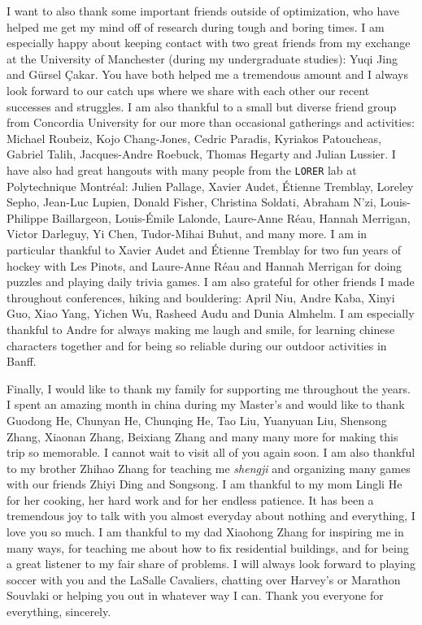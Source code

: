 I want to also thank some important friends outside of
optimization, who have helped me get my mind off of research
during tough and boring times.
I am especially happy about keeping contact with two great friends
from my exchange at the University of Manchester (during
my undergraduate studies): Yuqi Jing and Gürsel Çakar.
You have both helped me a tremendous amount and 
I always look forward to our catch ups where we share with each
other our recent successes and struggles.
I am also thankful to a small but diverse friend group
from Concordia University for our more than occasional 
gatherings and activities: Michael Roubeiz, Kojo Chang-Jones,
Cedric Paradis, Kyriakos Patoucheas, Gabriel Talih, Jacques-Andre
Roebuck, Thomas Hegarty and Julian Lussier.
I have also had great hangouts with many people
from the \texttt{LORER} lab at Polytechnique Montréal:
Julien Pallage, Xavier Audet, Étienne Tremblay,
Loreley Sepho, Jean-Luc Lupien, Donald Fisher, Christina Soldati, Abraham N'zi,
Louis-Philippe Baillargeon, Louis-Émile Lalonde, Laure-Anne Réau,
Hannah Merrigan, Victor Darleguy, Yi Chen, Tudor-Mihai Buhut, and many more.
I am in particular thankful to Xavier Audet and Étienne Tremblay for
two fun years of hockey with Les Pinots, and Laure-Anne Réau and Hannah
Merrigan for doing puzzles and playing daily trivia games.
I am also grateful for other friends I made throughout conferences,
hiking and bouldering: April Niu, Andre Kaba, Xinyi Guo,
Xiao Yang, Yichen Wu, Rasheed Audu and Dunia Almhelm.
I am especially thankful to Andre for always making me laugh and smile,
for learning chinese characters together and for being so reliable during our
outdoor activities in Banff.

Finally, I would like to thank my family for supporting me
throughout the years. I spent an amazing month in china during my Master's
and would like to thank Guodong He, Chunyan He, Chunqing He, Tao Liu,
Yuanyuan Liu, Shensong Zhang, Xiaonan Zhang, Beixiang Zhang
and many many more for making this trip
so memorable. I cannot wait to visit all of you again soon.
I am also thankful to my brother Zhihao Zhang for teaching me \emph{shengji}
and organizing many games with our friends Zhiyi Ding and Songsong.
I am thankful to my mom Lingli He for her cooking, her hard work and
for her endless patience. It has been a tremendous joy to talk with
you almost everyday about nothing and everything, I love you so much.
I am thankful to my dad Xiaohong Zhang for inspiring me in many ways,
for teaching me about how to fix residential buildings,
and for being a great listener to my fair share of problems. I will always
look forward to playing soccer with you and the LaSalle Cavaliers,
chatting over Harvey's or Marathon Souvlaki or helping you out in whatever way I can.
Thank you everyone for everything, sincerely.
